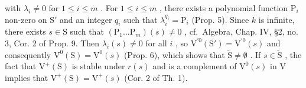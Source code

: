 with \(\lambda_{i} \neq 0\) for \(1 \leq i \leq m\) . For \(1 \leq i \leq m\) , there exists a polynomial function \(\mathrm{P}_{i}\) non-zero on \(\mathrm{S}'\) and an integer \(q_{i}\) such that \(\lambda_{i}^{q_{i}} = \mathrm{P}_{i}\) (Prop. 5). Since \(k\) is infinite, there exists \(s \in \mathrm{S}\) such that \((\mathrm{P}_{1} \ldots \mathrm{P}_{m})(s) \neq 0\) , cf.~Algebra, Chap. IV, §2, no. 3, Cor. 2 of Prop. 9. Then \(\lambda_{i}(s) \neq 0\) for all \(i\) , so \(\mathrm{V}^{\prime 0}(\mathrm{S}') = \mathrm{V}^{\prime 0}(s)\) and consequently \(\mathrm{V}^{0}(\mathrm{S}) = \mathrm{V}^{0}(s)\) (Prop. 6), which shows that \(\tilde{\mathrm{S}} \neq \emptyset\) . If \(s \in \tilde{\mathrm{S}}\) , the fact that \(\mathrm{V}^{+}(\mathrm{S})\) is stable under \(r(s)\) and is a complement of \(\mathrm{V}^{0}(s)\) in V implies that \(\mathrm{V}^{+}(\mathrm{S}) = \mathrm{V}^{+}(s)\) (Cor. 2 of Th. 1).

